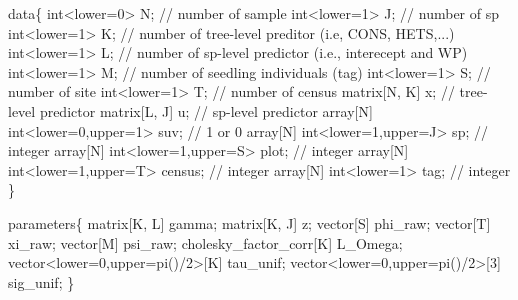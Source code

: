 \documentclass[
  11pt,
  letterpaper,
  DIV=11,
  numbers=noendperiod]{scrartcl}
\newenvironment{Shaded}{}{}
\newcommand{\CommentTok}[1]{\textcolor[rgb]{0.42,0.45,0.49}{#1}}
\newcommand{\DataTypeTok}[1]{\textcolor[rgb]{0.84,0.23,0.29}{#1}}
\newcommand{\DecValTok}[1]{\textcolor[rgb]{0.00,0.36,0.77}{#1}}
\newcommand{\KeywordTok}[1]{\textcolor[rgb]{0.84,0.23,0.29}{#1}}
\newcommand{\NormalTok}[1]{\textcolor[rgb]{0.14,0.16,0.18}{#1}}
\begin{document}
\begin{Shaded}
\begin{Highlighting}[]
\KeywordTok{data}\NormalTok{\{}
  \DataTypeTok{int}\NormalTok{\textless{}}\KeywordTok{lower}\NormalTok{=}\DecValTok{0}\NormalTok{\textgreater{} N; }\CommentTok{// number of sample}
  \DataTypeTok{int}\NormalTok{\textless{}}\KeywordTok{lower}\NormalTok{=}\DecValTok{1}\NormalTok{\textgreater{} J; }\CommentTok{// number of sp}
  \DataTypeTok{int}\NormalTok{\textless{}}\KeywordTok{lower}\NormalTok{=}\DecValTok{1}\NormalTok{\textgreater{} K; }\CommentTok{// number of tree{-}level preditor (i.e, CONS, HETS,...)}
  \DataTypeTok{int}\NormalTok{\textless{}}\KeywordTok{lower}\NormalTok{=}\DecValTok{1}\NormalTok{\textgreater{} L; }\CommentTok{// number of sp{-}level predictor (i.e., interecept and WP)}
  \DataTypeTok{int}\NormalTok{\textless{}}\KeywordTok{lower}\NormalTok{=}\DecValTok{1}\NormalTok{\textgreater{} M; }\CommentTok{// number of seedling individuals (tag)}
  \DataTypeTok{int}\NormalTok{\textless{}}\KeywordTok{lower}\NormalTok{=}\DecValTok{1}\NormalTok{\textgreater{} S; }\CommentTok{// number of site}
  \DataTypeTok{int}\NormalTok{\textless{}}\KeywordTok{lower}\NormalTok{=}\DecValTok{1}\NormalTok{\textgreater{} T; }\CommentTok{// number of census}
  \DataTypeTok{matrix}\NormalTok{[N, K] x; }\CommentTok{// tree{-}level predictor}
  \DataTypeTok{matrix}\NormalTok{[L, J] u; }\CommentTok{// sp{-}level predictor}
  \DataTypeTok{array}\NormalTok{[N] }\DataTypeTok{int}\NormalTok{\textless{}}\KeywordTok{lower}\NormalTok{=}\DecValTok{0}\NormalTok{,}\KeywordTok{upper}\NormalTok{=}\DecValTok{1}\NormalTok{\textgreater{} suv; }\CommentTok{// 1 or 0}
  \DataTypeTok{array}\NormalTok{[N] }\DataTypeTok{int}\NormalTok{\textless{}}\KeywordTok{lower}\NormalTok{=}\DecValTok{1}\NormalTok{,}\KeywordTok{upper}\NormalTok{=J\textgreater{} sp; }\CommentTok{// integer}
  \DataTypeTok{array}\NormalTok{[N] }\DataTypeTok{int}\NormalTok{\textless{}}\KeywordTok{lower}\NormalTok{=}\DecValTok{1}\NormalTok{,}\KeywordTok{upper}\NormalTok{=S\textgreater{} plot; }\CommentTok{// integer}
  \DataTypeTok{array}\NormalTok{[N] }\DataTypeTok{int}\NormalTok{\textless{}}\KeywordTok{lower}\NormalTok{=}\DecValTok{1}\NormalTok{,}\KeywordTok{upper}\NormalTok{=T\textgreater{} census; }\CommentTok{// integer}
  \DataTypeTok{array}\NormalTok{[N] }\DataTypeTok{int}\NormalTok{\textless{}}\KeywordTok{lower}\NormalTok{=}\DecValTok{1}\NormalTok{\textgreater{} tag; }\CommentTok{// integer}
\NormalTok{\}}

\KeywordTok{parameters}\NormalTok{\{}
  \DataTypeTok{matrix}\NormalTok{[K, L] gamma;}
  \DataTypeTok{matrix}\NormalTok{[K, J] z;}
  \DataTypeTok{vector}\NormalTok{[S] phi\_raw;}
  \DataTypeTok{vector}\NormalTok{[T] xi\_raw;}
  \DataTypeTok{vector}\NormalTok{[M] psi\_raw;}
  \DataTypeTok{cholesky\_factor\_corr}\NormalTok{[K] L\_Omega;}
  \DataTypeTok{vector}\NormalTok{\textless{}}\KeywordTok{lower}\NormalTok{=}\DecValTok{0}\NormalTok{,}\KeywordTok{upper}\NormalTok{=pi()/}\DecValTok{2}\NormalTok{\textgreater{}[K] tau\_unif;}
  \DataTypeTok{vector}\NormalTok{\textless{}}\KeywordTok{lower}\NormalTok{=}\DecValTok{0}\NormalTok{,}\KeywordTok{upper}\NormalTok{=pi()/}\DecValTok{2}\NormalTok{\textgreater{}[}\DecValTok{3}\NormalTok{] sig\_unif;}
\NormalTok{\}}


\end{Highlighting}
\end{Shaded}
\end{document}
